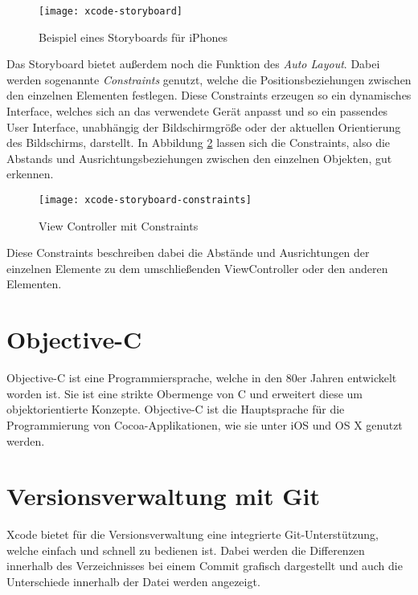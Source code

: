 \begin{figure}[htb!]
	\centering
	\texttt{[image: xcode-storyboard]}
	\caption{Beispiel eines Storyboards für iPhones}
	\label{xcode-storyboard}
\end{figure}

Das Storyboard bietet außerdem noch die Funktion des \emph{Auto Layout}. Dabei werden sogenannte \emph{Constraints} genutzt, welche die Positionsbeziehungen zwischen den einzelnen Elementen festlegen. Diese Constraints erzeugen so ein dynamisches Interface, welches sich an das verwendete Gerät anpasst und so ein passendes User Interface, unabhängig der Bildschirmgröße oder der aktuellen Orientierung des Bildschirms, darstellt.
In Abbildung \ref{xcode-storyboard-constraints} lassen sich die Constraints, also die Abstands und Ausrichtungsbeziehungen zwischen den einzelnen Objekten, gut erkennen.

\begin{figure}[htb!]
		\centering
	\texttt{[image: xcode-storyboard-constraints]}
	\caption{View Controller mit Constraints}
	\label{xcode-storyboard-constraints}
\end{figure}

Diese Constraints beschreiben dabei die Abstände und Ausrichtungen der einzelnen Elemente zu dem umschließenden ViewController oder den anderen Elementen.

\section{Objective-C}
\label{sec:tools:objectivec}
Objective-C ist eine Programmiersprache, welche in den 80er Jahren entwickelt worden ist. Sie ist eine strikte Obermenge von C und erweitert diese um objektorientierte Konzepte. Objective-C ist die Hauptsprache für die Programmierung von Cocoa-Applikationen, wie sie unter iOS und OS X genutzt werden.



\section{Versionsverwaltung mit Git}
\label{sec:tools:git}
Xcode bietet für die Versionsverwaltung eine integrierte Git-Unterstützung, welche einfach und schnell zu bedienen ist.
Dabei werden die Differenzen innerhalb des Verzeichnisses bei einem Commit grafisch dargestellt und auch die Unterschiede innerhalb der Datei werden angezeigt.

